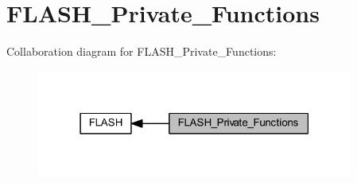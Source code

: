 \hypertarget{group___f_l_a_s_h___private___functions}{}\section{F\+L\+A\+S\+H\+\_\+\+Private\+\_\+\+Functions}
\label{group___f_l_a_s_h___private___functions}
Collaboration diagram for F\+L\+A\+S\+H\+\_\+\+Private\+\_\+\+Functions\+:
\nopagebreak
\begin{figure}[H]
\begin{center}
\leavevmode
\includegraphics[width=295pt]{group___f_l_a_s_h___private___functions}
\end{center}
\end{figure}
